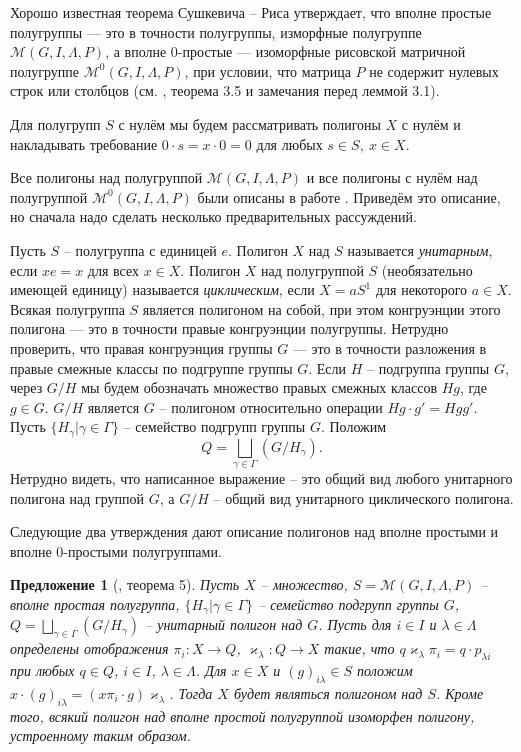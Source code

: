 \documentclass[a4paper]{article}
\newtheorem{proposition}{Предложение}
\begin{document}
	\par Хорошо известная теорема Сушкевича -- Риса утверждает, что вполне простые полугруппы --- это в точности полугруппы, изморфные полугруппе $\mathcal{M}(G,I,\Lambda,P)$, а вполне 0-простые --- изоморфные рисовской матричной полугруппе $\mathcal{M}^0(G,I,\Lambda,P)$, при условии, что матрица $P$ не содержит нулевых строк или столбцов (см. \cite{kliff}, теорема 3.5 и замечания перед леммой 3.1).
	
	\par Для полугрупп $S$ с нулём мы будем рассматривать полигоны $X$ с нулём и накладывать требование $0 \cdot s = x \cdot 0 = 0$ для любых $s\in S,\ x\in X$.
	
	\par Все полигоны над полугруппой $\mathcal{M}(G,I,\Lambda,P)$ и все полигоны с нулём над полугруппой $\mathcal{M}^0(G,I,\Lambda,P)$ были описаны в работе \cite{avdeev}. Приведём это описание, но сначала надо сделать несколько предварительных рассуждений.
	
	\par Пусть $S$ -- полугруппа с единицей $e$. Полигон $X$ над $S$ называется \textit{унитарным}, если $xe=x$ для всех $x \in X$. Полигон $X$ над полугруппой $S$ (необязательно имеющей единицу) называется \textit{циклическим}, если $X=aS^1$ для некоторого $a \in X$. Всякая полугруппа $S$ является полигоном на собой, при этом конгруэнции этого полигона --- это в точности правые конгруэнции полугруппы. Нетрудно проверить, что правая конгруэнция группы $G$ --- это в точности разложения в правые смежные классы по подгруппе группы $G$. Если $H$ -- подгруппа группы $G$, через $G/H$ мы будем обозначать множество правых смежных классов $Hg$, где $g \in G$. $G/H$ является $G$ -- полигоном относительно операции $Hg \cdot g' = Hgg'$. Пусть $\{ H_\gamma | \gamma \in \Gamma \}$ -- семейство подгрупп группы $G$. Положим $$ Q = \bigsqcup_{\gamma \in \Gamma} (G/H_\gamma). $$ Нетрудно видеть, что написанное выражение -- это общий вид любого унитарного полигона над группой $G$, а $G/H$ -- общий вид унитарного циклического полигона.
	
	\par Следующие два утверждения дают описание полигонов над вполне простыми и вполне 0-простыми полугруппами.
	
	\begin{proposition}[\cite{avdeev}, теорема 5] \label{pr01}
		Пусть $X$ -- множество, $S=\mathcal{M}(G,I,\Lambda,P)$ -- вполне простая полугруппа, $\{ H_\gamma | \gamma \in \Gamma \}$ -- семейство подгрупп группы $G$, $  Q = \bigsqcup_{\gamma \in \Gamma} (G/H_\gamma) $ -- унитарный полигон над $G$. Пусть для $i \in I$ и $\lambda \in \Lambda$ определены отображения $\pi_i:X \rightarrow Q$, $\varkappa_\lambda: Q \rightarrow X$ такие, что $q \varkappa_\lambda \pi_i = q \cdot p_{\lambda i}$ при любых $q \in Q$, $i \in I$, $\lambda \in \Lambda$. Для $x \in X$ и $(g)_{i \lambda} \in S$ положим $x \cdot (g)_{i \lambda} = (x \pi_i \cdot g)\varkappa_{\lambda}$. Тогда $X$ будет являться полигоном над $S$. Кроме того, всякий полигон над вполне простой полугруппой изоморфен полигону, устроенному таким образом.
	\end{proposition}
	
\end{document}
